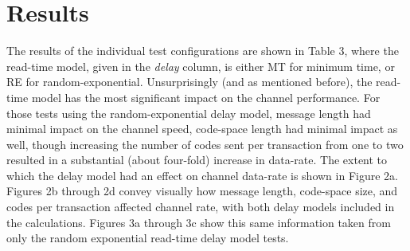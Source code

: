 \documentclass[10pt, conference]{IEEEtran}
\begin{document}
\section{Results}
The results of the individual test configurations are shown in Table 3, where the read-time model, given in the {\em delay} column, is either MT for minimum time, or RE for random-exponential. Unsurprisingly (and as mentioned before), the read-time model has the most significant impact on the channel performance.  For those tests using the random-exponential delay model, message length had minimal impact on the channel speed, code-space length had minimal impact as well, though increasing the number of codes sent per transaction from one to two resulted in a substantial (about four-fold) increase in data-rate.  The extent to which the delay model had an effect on channel data-rate is shown in Figure 2a.  Figures 2b through 2d convey visually how message length, code-space size, and codes per transaction affected channel rate, with both delay models included in the calculations.  Figures 3a through 3c show this same information taken from only the random exponential read-time delay model tests.
\end{document}
